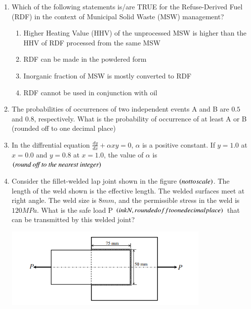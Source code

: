 \documentclass[journal,14pt,onecolumn]{IEEEtran}
\theoremstyle{remark}
\begin{document}
\begin{enumerate}[label={Q\arabic*.}]
\item Which of the following statements is/are TRUE for the Refuse-Derived Fuel (RDF) in the context of Municipal Solid Waste (MSW) management?
\begin{enumerate}
    \item Higher Heating Value (HHV) of the unprocessed MSW is higher than the HHV of RDF processed from the same MSW
    \item RDF can be made in the powdered form
    \item Inorganic fraction of MSW is mostly converted to RDF
    \item RDF cannot be used in conjunction with oil
\end{enumerate}
\vspace{1cm}

\item The probabilities of occurrences of two independent events A and B are $0.5$ and $0.8$, respectively. What is the probability of occurrence of at least A or B (rounded off to one decimal place) \underline{\hspace{3cm}}
\vspace{1cm}

\item In the diffrential equation $\frac{dy}{dx}+\alpha xy=0$, $\alpha$ is a positive constant. If $y=1.0$ at $x=0.0$ and $y=0.8$ at $x=1.0$, the value of $\alpha$ is \underline{\hspace{2cm}} $\left(\textit{round off to the nearest integer}\right)$
\vspace{1cm}

\item Consider the fillet-welded lap joint shown in the figure $\left(not to scale\right)$. The length of the weld shown is the effective length. The welded surfaces meet at right angle. The weld size is $8 mm$, and the permissible stress in the weld is $120MPa$. What is the safe load P $\left(in kN, rounded off to one decimal place\right)$ that can be transmitted by this welded joint? \underline{\hspace{2cm}}
\begin{center}
\includegraphics[width=10cm]{pics/Screenshot 2025-08-06 121746.png}
\end{center}
\vspace{1cm}


\end{enumerate}
\end{document}
